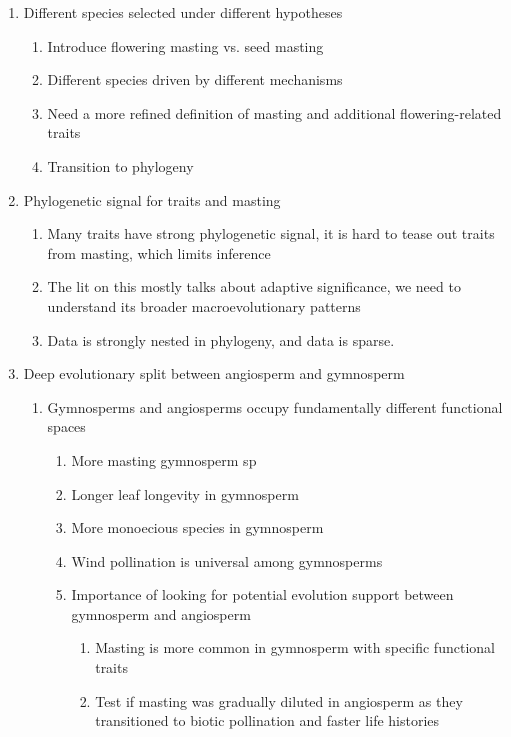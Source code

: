 \documentclass{article}
\begin{document}
\begin{enumerate}
\begin{enumerate}
\end{enumerate}
\item Different species selected under different hypotheses
\begin{enumerate}
\item Introduce flowering masting vs. seed masting
\item Different species driven by different mechanisms
\item Need a more refined definition of masting and additional flowering-related traits
\item Transition to phylogeny
\end{enumerate}
\item Phylogenetic signal for traits and masting
\begin{enumerate}
\item Many traits have strong phylogenetic signal, it is hard to tease out traits from masting, which limits inference
\item The lit on this mostly talks about adaptive significance, we need to understand its broader macroevolutionary patterns
\item Data is strongly nested in phylogeny, and data is sparse.
\end{enumerate}
\item Deep evolutionary split between angiosperm and gymnosperm 
\begin{enumerate}
\item Gymnosperms and angiosperms occupy fundamentally different functional spaces
\begin{enumerate}
\item More masting gymnosperm sp
\item Longer leaf longevity in gymnosperm
\item More monoecious species in gymnosperm
\item Wind pollination is universal among gymnosperms
\item Importance of looking for potential evolution support between gymnosperm and angiosperm
\begin{enumerate}
\item Masting is more common in gymnosperm with specific functional traits
\item Test if masting was gradually diluted in angiosperm as they transitioned to biotic pollination and faster life histories
\end{enumerate}
\end{enumerate}
\end{enumerate}


\end{enumerate}
\end{document}
